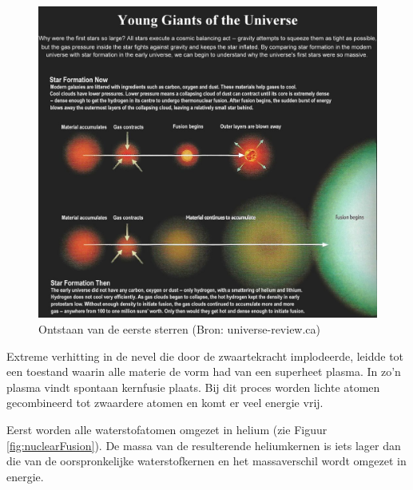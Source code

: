 \documentclass[
  11pt,
]{book}
\begin{document}
\begin{figure}

{\centering \includegraphics[width=1\linewidth]{./figs/I08-13-firststars6} 

}

\caption{Ontstaan van de eerste sterren (Bron: universe-review.ca)}\label{fig:genesisStar}
\end{figure}

Extreme verhitting in de nevel die door de zwaartekracht implodeerde, leidde tot een toestand waarin alle materie de vorm had van een superheet plasma. In zo'n plasma vindt spontaan kernfusie plaats. Bij dit proces worden lichte atomen gecombineerd tot zwaardere atomen en komt er veel energie vrij.

Eerst worden alle waterstofatomen omgezet in helium (zie Figuur \ref{fig:nuclearFusion}). De massa van de resulterende heliumkernen is iets lager dan die van de oorspronkelijke waterstofkernen en het massaverschil wordt omgezet in energie.
\end{document}
